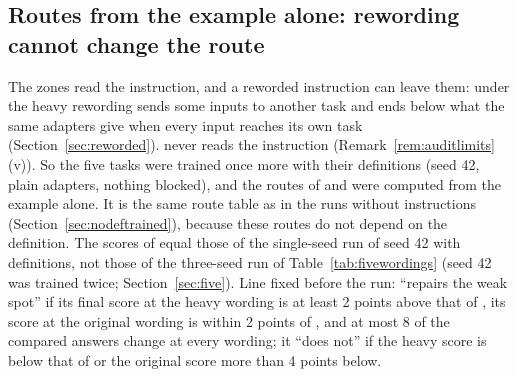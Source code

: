 \subsection{Routes from the example alone: rewording cannot change the route}
\label{sec:exampleroutes}

The zones read the instruction, and a reworded instruction can leave them: under the heavy
rewording \cert{} sends some inputs to another task and ends below what the same adapters give
when every input reaches its own task (Section~\ref{sec:reworded}). \recog{} never
reads the instruction (Remark~\ref{rem:auditlimits}(v)). So the five tasks were trained once more
with their definitions (seed 42, plain adapters, nothing blocked), and the routes of \recog{} and
\handicap{} were computed from the example alone. It is the same route table as in the runs without
instructions (Section~\ref{sec:nodeftrained}), because these routes do not depend on the definition.
The scores of \cert{} equal those of the single-seed run of seed 42 with definitions, not those of the three-seed run of Table~\ref{tab:fivewordings} (seed 42 was trained twice; Section~\ref{sec:five}).
Line fixed before the run: \recog{} ``repairs the weak spot'' if its final score at the heavy
wording is at least 2 points above that of \cert{}, its score at the original wording is within
2 points of \cert{}, and at most 8 of the \AudUCompared{} compared answers change at every wording;
it ``does not'' if the heavy score is below that of \cert{} or the original score more than 4
points below.

\begin{table}[t]
  \caption{The five tasks with their definitions, seed 42, T5-base, 10 epochs, plain adapters; the
  same adapters under each rule, at the four wordings of the definition. Top: final score (AP,
  re-test). Bottom: answers to the test inputs of the first four tasks that differ at the end from
  the answer right after their task was learned, of \AudUCompared{}. \recog{} and \handicap{} set
  the route from the example alone; ``zone first'' uses the certified route where the input is
  inside a zone and the route of \recog{} or \handicap{} elsewhere. The rows of the published
  methods are from the run of the same seed in Section~\ref{sec:reworded}.}
  \label{tab:instanceroutes}
  \centering
  
\end{table}

